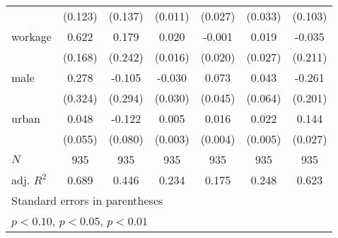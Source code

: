 {\begin{tabular}{l*{6}{c}}
            &     (0.123)         &     (0.137)         &     (0.011)         &     (0.027)         &     (0.033)         &     (0.103)         \\
[1em]
workage     &       0.622\sym{***}&       0.179         &       0.020         &      -0.001         &       0.019         &      -0.035         \\
            &     (0.168)         &     (0.242)         &     (0.016)         &     (0.020)         &     (0.027)         &     (0.211)         \\
[1em]
male        &       0.278         &      -0.105         &      -0.030         &       0.073         &       0.043         &      -0.261         \\
            &     (0.324)         &     (0.294)         &     (0.030)         &     (0.045)         &     (0.064)         &     (0.201)         \\
[1em]
urban       &       0.048         &      -0.122         &       0.005\sym{**} &       0.016\sym{***}&       0.022\sym{***}&       0.144\sym{***}\\
            &     (0.055)         &     (0.080)         &     (0.003)         &     (0.004)         &     (0.005)         &     (0.027)         \\
\hline
\(N\)       &         935         &         935         &         935         &         935         &         935         &         935         \\
adj. \(R^{2}\)&       0.689         &       0.446         &       0.234         &       0.175         &       0.248         &       0.623         \\
\hline\hline
\multicolumn{7}{l}{\footnotesize Standard errors in parentheses}\\
\multicolumn{7}{l}{\footnotesize \sym{*} \(p<0.10\), \sym{**} \(p<0.05\), \sym{***} \(p<0.01\)}\\
\end{tabular}
}
